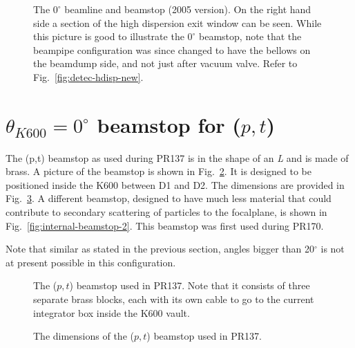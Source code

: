 \documentclass[11pt]{report}
\begin{document}
\begin{figure}[!ht]
\centerline{\vspace{0cm}\hspace{0cm}
}
\centering
\caption{The $0^{\circ}$ beamline and beamstop (2005 version). On the right hand side a section of the high dispersion exit window can be seen. While this picture is good to illustrate the $0^{\circ}$ beamstop, note that the beampipe configuration was since changed to have the bellows on the beamdump side, and not just after vacuum valve.  Refer to Fig.~\ref{fig:detec-hdisp-new}. }
\label{fig:zerod-beamstop-pic}
\end{figure} 



\section{$\theta_{K600}=0^{\circ}$ beamstop for ($p,t$)}

The (p,t) beamstop  as used during PR137 is in the shape of an {\it L} and is made of brass. 
A picture of the beamstop is shown in Fig.~\ref{fig:internal-beamstop-1}.
It is designed to be positioned inside the K600 between D1 and D2.
The dimensions are provided in Fig.~\ref{fig:internal-beamstop-fig}.
A different beamstop, designed to have much less material that could contribute to 
secondary scattering of particles to the focalplane, is shown in Fig.~\ref{fig:internal-beamstop-2}.
This beamstop was first used during PR170.

Note that similar as stated in the previous section, angles bigger than 20$^{\circ}$ is not
at present possible in this configuration.





\begin{figure}[!ht]
\centerline{\vspace{0cm}\hspace{0cm}
}
\centering
\caption{The ($p,t$) beamstop used in PR137. 
Note that it consists of three separate brass blocks, each with
its own cable to go to the current integrator box inside the K600 vault.}
\label{fig:internal-beamstop-1}
\end{figure} 

\begin{figure}[!ht]
\centerline{\vspace{0cm}\hspace{0cm}
}
\centering
\caption{The dimensions of the ($p,t$) beamstop used in PR137.}
\label{fig:internal-beamstop-fig}
\end{figure} 
\end{document}
